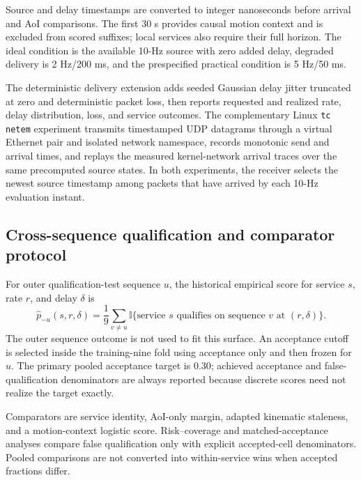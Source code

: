 \documentclass[journal,onecolumn]{IEEEtran}
\begin{document}
Source and delay timestamps are converted to integer nanoseconds before arrival and AoI comparisons. The first 30 s provides causal motion context and is excluded from scored suffixes; local services also require their full horizon. The ideal condition is the available 10-Hz source with zero added delay, degraded delivery is 2 Hz/200 ms, and the prespecified practical condition is 5 Hz/50 ms.

The deterministic delivery extension adds seeded Gaussian delay jitter truncated at zero and deterministic packet loss, then reports requested and realized rate, delay distribution, loss, and service outcomes. The complementary Linux \texttt{tc netem} experiment transmits timestamped UDP datagrams through a virtual Ethernet pair and isolated network namespace, records monotonic send and arrival times, and replays the measured kernel-network arrival traces over the same precomputed source states. In both experiments, the receiver selects the newest source timestamp among packets that have arrived by each 10-Hz evaluation instant.

\subsection{Cross-sequence qualification and comparator protocol}
For outer qualification-test sequence $u$, the historical empirical score for service $s$, rate $r$, and delay $\delta$ is
\begin{equation}
\widehat p_{-u}(s,r,\delta)=
\frac{1}{9}\sum_{v\ne u}
\mathbb{I}\{\text{service }s\text{ qualifies on sequence }v\text{ at }(r,\delta)\}.
\end{equation}
The outer sequence outcome is not used to fit this surface. An acceptance cutoff is selected inside the training-nine fold using acceptance only and then frozen for $u$. The primary pooled acceptance target is 0.30; achieved acceptance and false-qualification denominators are always reported because discrete scores need not realize the target exactly.

Comparators are service identity, AoI-only margin, adapted kinematic staleness, and a motion-context logistic score. Risk--coverage and matched-acceptance analyses compare false qualification only with explicit accepted-cell denominators. Pooled comparisons are not converted into within-service wins when accepted fractions differ.
\end{document}
